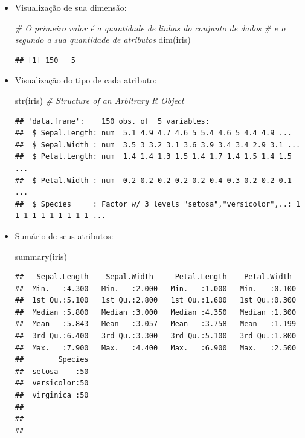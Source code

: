 \documentclass[
]{book}
\newenvironment{Shaded}{\begin{snugshade}}{\end{snugshade}}
\newcommand{\CommentTok}[1]{\textcolor[rgb]{0.56,0.35,0.01}{\textit{#1}}}
\newcommand{\FunctionTok}[1]{\textcolor[rgb]{0.00,0.00,0.00}{#1}}
\newcommand{\NormalTok}[1]{#1}
\begin{document}
\begin{itemize}
\item
  Visualização de sua dimensão:

\begin{Shaded}
\begin{Highlighting}[]
\CommentTok{\# O primeiro valor é a quantidade de linhas do conjunto de dados}
\CommentTok{\# e o segundo a sua quantidade de atributos}
\FunctionTok{dim}\NormalTok{(iris)}
\end{Highlighting}
\end{Shaded}

\begin{verbatim}
## [1] 150   5
\end{verbatim}
\item
  Visualização do tipo de cada atributo:

\begin{Shaded}
\begin{Highlighting}[]
\FunctionTok{str}\NormalTok{(iris) }\CommentTok{\# Structure of an Arbitrary R Object}
\end{Highlighting}
\end{Shaded}

\begin{verbatim}
## 'data.frame':    150 obs. of  5 variables:
##  $ Sepal.Length: num  5.1 4.9 4.7 4.6 5 5.4 4.6 5 4.4 4.9 ...
##  $ Sepal.Width : num  3.5 3 3.2 3.1 3.6 3.9 3.4 3.4 2.9 3.1 ...
##  $ Petal.Length: num  1.4 1.4 1.3 1.5 1.4 1.7 1.4 1.5 1.4 1.5 ...
##  $ Petal.Width : num  0.2 0.2 0.2 0.2 0.2 0.4 0.3 0.2 0.2 0.1 ...
##  $ Species     : Factor w/ 3 levels "setosa","versicolor",..: 1 1 1 1 1 1 1 1 1 1 ...
\end{verbatim}
\item
  Sumário de seus atributos:

\begin{Shaded}
\begin{Highlighting}[]
\FunctionTok{summary}\NormalTok{(iris)}
\end{Highlighting}
\end{Shaded}

\begin{verbatim}
##   Sepal.Length    Sepal.Width     Petal.Length    Petal.Width   
##  Min.   :4.300   Min.   :2.000   Min.   :1.000   Min.   :0.100  
##  1st Qu.:5.100   1st Qu.:2.800   1st Qu.:1.600   1st Qu.:0.300  
##  Median :5.800   Median :3.000   Median :4.350   Median :1.300  
##  Mean   :5.843   Mean   :3.057   Mean   :3.758   Mean   :1.199  
##  3rd Qu.:6.400   3rd Qu.:3.300   3rd Qu.:5.100   3rd Qu.:1.800  
##  Max.   :7.900   Max.   :4.400   Max.   :6.900   Max.   :2.500  
##        Species  
##  setosa    :50  
##  versicolor:50  
##  virginica :50  
##                 
##                 
## 
\end{verbatim}
\end{itemize}
\end{document}
